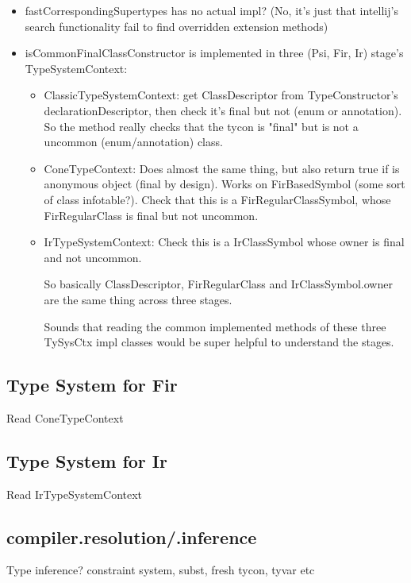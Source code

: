 \documentclass{article}
\begin{document}
\begin{itemize}
    \item fastCorrespondingSupertypes has no actual impl? (No, it's just that intellij's search functionality fail to find overridden extension methods)
    \item isCommonFinalClassConstructor is implemented in three (Psi, Fir, Ir) stage's TypeSystemContext:
    \begin{itemize}
        \item ClassicTypeSystemContext: get ClassDescriptor from TypeConstructor's declarationDescriptor, then check it's final but not (enum or annotation). So the method really checks that the tycon is "final" but is not a uncommon (enum/annotation) class.
        \item ConeTypeContext: Does almost the same thing, but also return true if is anonymous object (final by design). Works on FirBasedSymbol (some sort of class infotable?). Check that this is a FirRegularClassSymbol, whose FirRegularClass is final but not uncommon.
        \item IrTypeSystemContext: Check this is a IrClassSymbol whose owner is final and not uncommon.

        So basically ClassDescriptor, FirRegularClass and IrClassSymbol.owner are the same thing across three stages.

        Sounds that reading the common implemented methods of these three TySysCtx impl classes would be super helpful to understand the stages.
    \end{itemize}
\end{itemize}

\subsection{Type System for Fir}

Read ConeTypeContext

\subsection{Type System for Ir}

Read IrTypeSystemContext

\subsection{compiler.resolution/.inference}

Type inference? constraint system, subst, fresh tycon, tyvar etc
\end{document}
